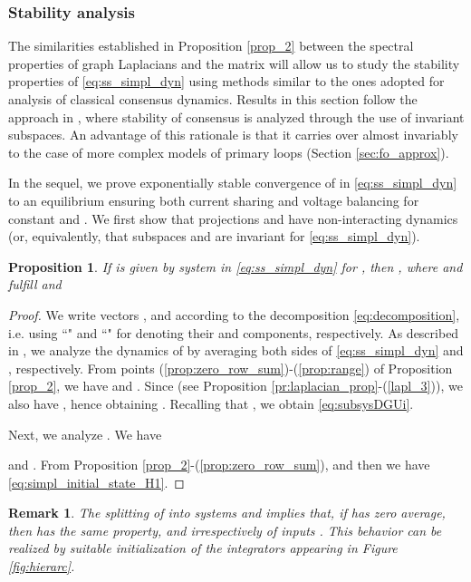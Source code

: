\documentclass[a4paper]{article}
\theoremstyle{plain}
\newtheorem{rmk}{Remark}
\newtheorem{prp}{Proposition}
\begin{document}
\subsubsection{Stability analysis}
\label{sec:st_an_1}
The similarities established in Proposition \ref{prop_2} between the spectral properties of graph Laplacians and the matrix  will allow us to study the stability properties of \eqref{eq:ss_simpl_dyn} using methods similar to the ones adopted for analysis of classical consensus dynamics. Results in this section follow the approach in \cite{1643380}, where stability of consensus is analyzed through the use of invariant subspaces. An advantage of this rationale is that it carries over almost invariably to the case of more complex models of primary loops (Section \ref{sec:fo_approx}).

In the sequel, we prove exponentially stable convergence of
 in \eqref{eq:ss_simpl_dyn} to an equilibrium
ensuring both current sharing and voltage balancing for constant
 and . We first show that projections  and  have non-interacting dynamics (or, equivalently, that subspaces  and  are invariant for \eqref{eq:ss_simpl_dyn}).
\begin{prp}
	\label{pr:invariant}
	If  is given by system  in
	\eqref{eq:ss_simpl_dyn} for , then , where  and  fulfill
	 and
	
\end{prp}
\begin{proof}
	We write vectors ,  and
	 according to the decomposition
	\eqref{eq:decomposition}, i.e. using
	``\hspace{1mm}\hspace{1mm}" and
	``\hspace{1mm}\hspace{1mm}" for
	denoting their  and  components, respectively. As described in \cite{1643380}, we analyze the dynamics of
	 by averaging both sides of
	\eqref{eq:ss_simpl_dyn} and , respectively. From points (\ref{prop:zero_row_sum})-(\ref{prop:range}) of Proposition
	\ref{prop_2}, we have
	 and . Since  (see Proposition \ref{pr:laplacian_prop}-(\ref{lapl_3})), we also have , hence obtaining . Recalling that , we obtain \eqref{eq:subsysDGUi}.
	
	Next, we analyze . We have
	
	and . From Proposition \ref{prop_2}-(\ref{prop:zero_row_sum}),  and then we have \eqref{eq:simpl_initial_state_H1}.  
\end{proof}
\begin{rmk}
	\label{rmk:splitting}
	The splitting of  into systems  and
	 implies that, if  has zero
	average, then  has the same property,
	 and irrespectively of inputs
	. This behavior can be realized by
	suitable initialization of the integrators appearing in Figure \ref{fig:hierarc}.
\end{rmk}
\end{document}

